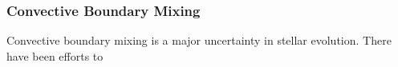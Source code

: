 {\color{purple}
\subsubsection{Convective Boundary Mixing}
}

Convective boundary mixing is a major uncertainty in stellar evolution. There have been efforts to 


